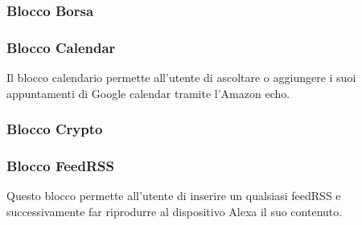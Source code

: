 \subsubsection{Blocco Borsa}

\subsubsection{Blocco Calendar}
Il blocco calendario permette all'utente di ascoltare o aggiungere i suoi appuntamenti di Google calendar tramite l'Amazon echo.

\subsubsection{Blocco Crypto}

\subsubsection{Blocco FeedRSS}
Questo blocco permette all'utente di inserire un qualsiasi feedRSS e successivamente far riprodurre al dispositivo Alexa il suo contenuto.
